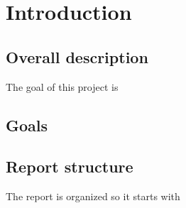 \chapter{Introduction}
\label{chap:introduction}

\section{Overall description}
\label{sec:overall_description}
The goal of this project is 

\section{Goals}
\label{sec:goals}

\section{Report structure}
\label{sec:report_structure}
The report is organized so it starts with	
